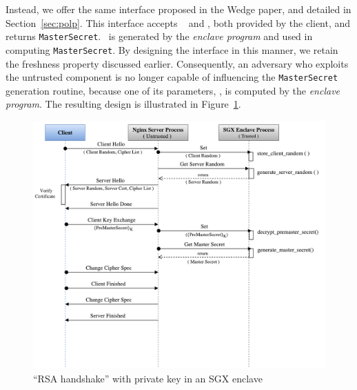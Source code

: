 \documentclass[../../main.tex]{subfiles}
\begin{document}
Instead, we offer the same interface proposed in the Wedge paper, and
detailed in Section~\ref{sec:polp}. This interface accepts \crandom~
and \premaster, both provided by the client, and returns
\texttt{MasterSecret}. \srandom~is generated by the \textit{enclave
  program} and used in computing \texttt{MasterSecret}. By designing
the interface in this manner, we retain the freshness property
discussed earlier. Consequently, an adversary who exploits the
untrusted component is no longer capable of influencing the
\texttt{MasterSecret} generation routine, because one of its
parameters, \srandom, is computed by the \textit{enclave program}.
The resulting design is illustrated in Figure~\ref{fig:rsa-enc}.

\begin{figure}[H]
  \centering
  \includegraphics[scale=0.35]{images/RSA-SGX-Handshake.pdf}
  \caption[``RSA handshake'' and enclave]{``RSA handshake'' with
    private key in an SGX enclave}
  \label{fig:rsa-enc}
\end{figure}
\end{document}
